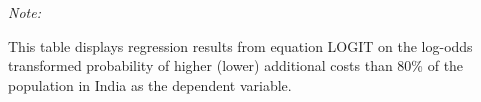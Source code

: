 \begin{table}[htbp!]
\begin{adjustbox}{width = 1\textwidth, max height = 0.95\textheight, center}
\begin{threeparttable}[b]
         \begin{tablenotes}\item \medskip \textit{Note:}
            \item This table displays regression results from equation LOGIT on the log-odds transformed probability of higher (lower) additional costs than 80\% of the population in India as the dependent variable. 
         \end{tablenotes}
      \end{threeparttable}
   \end{adjustbox}
\end{table}


